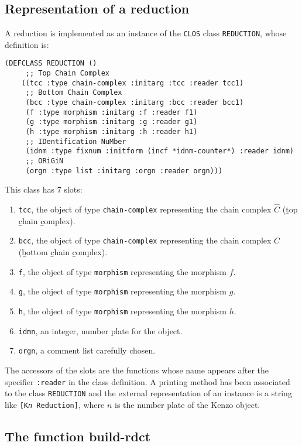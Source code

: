 \subsection {Representation of a reduction}

A reduction is implemented as an instance of 
the {\tt CLOS} class {\tt REDUCTION}, whose
definition is:
{\footnotesize\begin{verbatim}
(DEFCLASS REDUCTION ()
     ;; Top Chain Complex
    ((tcc :type chain-complex :initarg :tcc :reader tcc1)
     ;; Bottom Chain Complex
     (bcc :type chain-complex :initarg :bcc :reader bcc1)
     (f :type morphism :initarg :f :reader f1)
     (g :type morphism :initarg :g :reader g1)
     (h :type morphism :initarg :h :reader h1)
     ;; IDentification NuMber
     (idnm :type fixnum :initform (incf *idnm-counter*) :reader idnm)
     ;; ORiGiN
     (orgn :type list :initarg :orgn :reader orgn)))
\end{verbatim}}
This class has $7$  slots:
\begin{enumerate}
\item {\tt tcc}, the object of type {\tt chain-complex} representing the chain complex $\hat C$ 
(\b top \b chain \b complex).
\item {\tt bcc},  the object of type {\tt chain-complex}  representing the chain complex $C$ 
(\b bottom \b chain \b complex).
\item {\tt f}, the object of type {\tt morphism}  representing the morphism $f$.
\item {\tt g}, the object of type {\tt morphism}  representing the morphism $g$.
\item {\tt h}, the object of type {\tt morphism}  representing the morphism $h$.
\item {\tt idmn}, an integer, number plate for the object.
\item {\tt orgn}, a comment list carefully chosen.
\end{enumerate}
The accessors of the slots are the functions whose name appears after the specifier {\tt:reader} in
the class definition. A printing method has been associated to the class {\tt REDUCTION} 
and the external representation of an instance is a string like {\tt [K{\em n} Reduction]}, where $n$
is the number plate of the Kenzo object.

\subsection {The function build-rdct}

